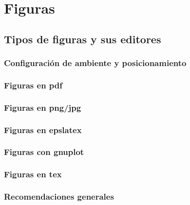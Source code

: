 \chapter{Figuras}
\label{chap:figuras}


 
 
 \section{Tipos de figuras y sus editores}
\subsection{Configuración de ambiente y posicionamiento}

\subsection{Figuras en pdf}
\subsection{Figuras en png/jpg}
\subsection{Figuras en epslatex}
\subsection{Figuras con gnuplot}
\subsection{Figuras en tex}
\subsection{Recomendaciones generales}
